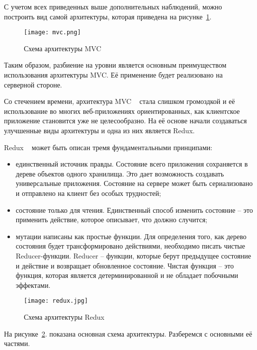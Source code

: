 С учетом всех приведенных выше дополнительных наблюдений, можно построить вид самой архитектуры, которая приведена на рисунке~\ref{fig:domain:manual_structure:credit_net}.

\begin{figure}[ht]
\centering
  \texttt{[image: mvc.png]}  
  \caption{ 
  Схема архитектуры MVC }
  \label{fig:domain:manual_structure:credit_net}
\end{figure}

Таким образом, разбиение на уровни является основным преимуществом использования архитектуры MVC. Её применение будет реализовано на серверной стороне.

Со стечением времени, архитектура MVC ~\cite{mvc} стала слишком громоздкой и её использование во многих веб-приложениях ориентированных, как клиентское приложение становится уже не целесообразно. На её основе начали создаваться улучшенные виды архитектуры и одна из них является Redux.

Redux ~\cite{redux} может быть описан тремя фундаментальными принципами:
 
\begin{itemize}
  \item единственный источник правды. Состояние всего приложения сохраняется в дереве объектов одного хранилища. Это дает возможность создавать универсальные приложения. Состояние на сервере может быть сериализовано и отправлено на клиент без особых трудностей;
  \item состояние только для чтения. Единственный способ изменить состояние -- это применить действие, которое описывает, что должно случится;
  \item мутации написаны как простые функции. Для определения того, как дерево состояния будет трансформировано действиями, необходимо писать чистые Reducer-функции. Reducer -- функции, которые берут предыдущее состояние и действие и возвращает обновленное состояние. Чистая функция -- это функция, которая является детерминированной и не обладает побочными эффектами.
\end{itemize}

\begin{figure}[ht]
\centering
  \texttt{[image: redux.jpg]}  
  \caption{ Схема архитектуры Redux }
  \label{fig:domain:manual_structure:credit_redux}
\end{figure}

На рисунке~\ref{fig:domain:manual_structure:credit_redux}. показана основная схема архитектуры. Разберемся с основными её частями.

